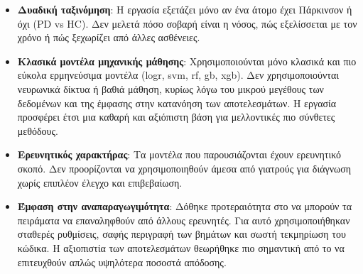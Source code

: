 \begin{itemize}
    \item \textbf{Δυαδική ταξινόμηση}: Η εργασία εξετάζει μόνο αν ένα άτομο έχει Πάρκινσον ή όχι (PD vs HC). Δεν μελετά πόσο σοβαρή είναι η νόσος, πώς εξελίσσεται με τον χρόνο ή πώς ξεχωρίζει από άλλες ασθένειες.
    \item \textbf{Κλασικά μοντέλα μηχανικής μάθησης}: Χρησιμοποιούνται μόνο κλασικά και πιο εύκολα ερμηνεύσιμα μοντέλα (\gls{logr}, \gls{svm}, \gls{rf}, \gls{gb}, \gls{xgb}). Δεν χρησιμοποιούνται νευρωνικά δίκτυα ή βαθιά μάθηση, κυρίως λόγω του μικρού μεγέθους των δεδομένων και της έμφασης στην κατανόηση των αποτελεσμάτων. Η εργασία προσφέρει έτσι μια καθαρή και αξιόπιστη βάση για μελλοντικές πιο σύνθετες μεθόδους.
    \item \textbf{Ερευνητικός χαρακτήρας}: Τα μοντέλα που παρουσιάζονται έχουν ερευνητικό σκοπό. Δεν προορίζονται να χρησιμοποιηθούν άμεσα από γιατρούς για διάγνωση χωρίς επιπλέον έλεγχο και επιβεβαίωση.
    \item \textbf{Έμφαση στην αναπαραγωγιμότητα}: Δόθηκε προτεραιότητα στο να μπορούν τα πειράματα να επαναληφθούν από άλλους ερευνητές. Για αυτό χρησιμοποιήθηκαν σταθερές ρυθμίσεις, σαφής περιγραφή των βημάτων και σωστή τεκμηρίωση του κώδικα. Η αξιοπιστία των αποτελεσμάτων θεωρήθηκε πιο σημαντική από το να επιτευχθούν απλώς υψηλότερα ποσοστά απόδοσης.
\end{itemize}